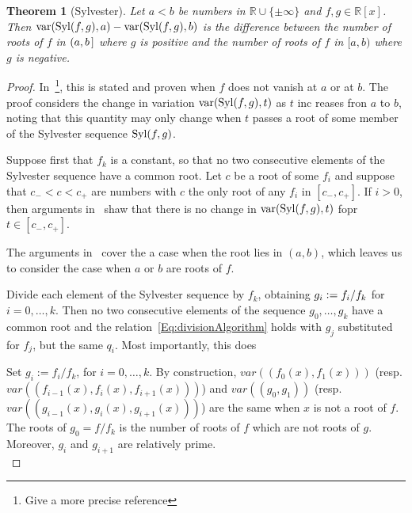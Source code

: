 \documentclass[12pt]{amsart}
\newtheorem{theorem}{Theorem}
\theoremstyle{definition}
\newcommand{\RR}{\mathbb{R}}
\DeclareMathOperator{\var}{{\rm var}}
\DeclareMathOperator{\Syl}{{\rm Syl}}
\begin{document}
\begin{theorem}[Sylvester]
  \label{Th:Sylvester}
  Let $a<b$ be numbers in $\RR\cup\{\pm\infty\}$ and $f,g\in\RR[x]$.
  Then $\var(\Syl(f,g), a)-\var(\Syl(f,g), b)$ is 
  the difference between the number of roots of $f$ in $(a,b\hspace{.05cm}]$ where $g$ is positive and the number of roots of $f$ in $[a,b)$
  where $g$ is negative.
\end{theorem}
\begin{proof}
  In~\cite{BCR}\footnote{Give a more precise reference}, this is stated and proven when $f$ does not vanish at $a$ or at $b$.
  The proof considers the change in variation $\var(\Syl(f,g), t)$ as $t$ inc reases fron $a$ to $b$, noting that this quantity may only
  change when $t$ passes a root of some member of the Sylvester sequence $\Syl(f,g)$.
  
  Suppose first that $f_k$ is a constant, so that no two consecutive elements of the Sylvester sequence have a common root.
  Let $c$ be a root of some $f_i$ and suppose that $c_-<c<c_+$ are numbers with $c$ the only root of any $f_i$ in $[c_-,c_+]$.
  If $i>0$, then arguments in~\cite{BCR} shaw that there is no change in  $\var(\Syl(f,g), t)$ fopr $t\in[c_-,c_+]$.


The arguments in~\cite{BCR} cover the a case when the root lies in $(a,b)$, which leaves us to consider the case when $a$ or $b$ are roots
  of $f$.

  
  Divide each element of the Sylvester sequence by $f_k$, obtaining $g_i\vcentcolon= f_i/f_k$ for  $i=0,\dotsc, k$.
  Then no two consecutive elements of the sequence $g_0,\dotsc,g_k$ have a common root and the relation~\eqref{Eq:divisionAlgorithm} holds
  with $g_j$ substituted for $f_j$, but the same $q_i$.
  Most importantly, this does 


  
  
  Set $g_{i} := f_{i}/f_{k}$, for $i=0,\dots, k$. By construction, $var((f_{0}(x),f_{1}(x)))$ (resp. $var((f_{i-1}(x),f_{i}(x),f_{i+1}(x)))$) and $var((g_{0},g_{1}))$ (resp. $var((g_{i-1}(x),g_{i}(x),g_{i+1}(x)))$) are the same when $x$ is not a root of $f$. The roots of $g_{0} = f/f_{k}$ is the number of roots of $f$ which are not roots of $g$. Moreover, $g_{i}$ and $g_{i+1}$ are relatively prime.\\


\end{proof}
\end{document}
